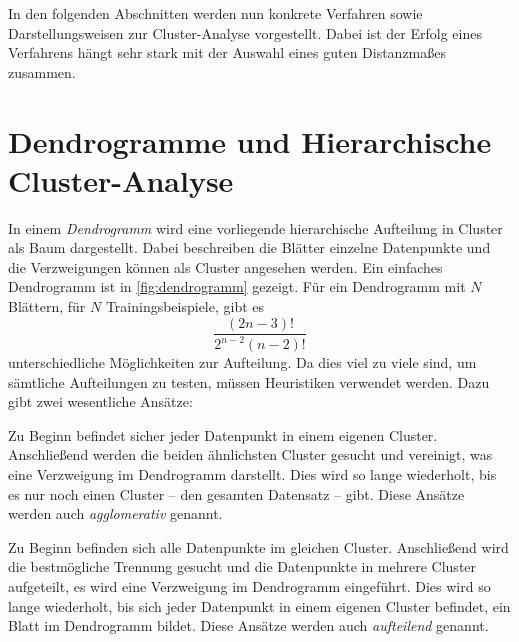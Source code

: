 	In den folgenden Abschnitten werden nun konkrete Verfahren sowie Darstellungsweisen zur Cluster-Analyse vorgestellt. Dabei ist der Erfolg eines Verfahrens hängt sehr stark mit der Auswahl eines guten Distanzmaßes zusammen.

	\section{Dendrogramme und Hierarchische Cluster-Analyse}
		In einem \emph{Dendrogramm} wird eine vorliegende hierarchische Aufteilung in Cluster als Baum dargestellt. Dabei beschreiben die Blätter einzelne Datenpunkte und die Verzweigungen können als Cluster angesehen werden. Ein einfaches Dendrogramm ist in \autoref{fig:dendrogramm} gezeigt. Für ein Dendrogramm mit \(N\) Blättern, \dh für \(N\) Trainingsbeispiele, gibt es
		\begin{equation}
			\frac{(2n - 3)!}{2^{n - 2} (n - 2)!}
		\end{equation}
		unterschiedliche Möglichkeiten zur Aufteilung. Da dies viel zu viele sind, um sämtliche Aufteilungen zu testen, müssen Heuristiken verwendet werden. Dazu gibt zwei wesentliche Ansätze:
		\begin{description}[leftmargin = 2.5cm]
			\item[Bottom-Up] Zu Beginn befindet sicher jeder Datenpunkt in einem eigenen Cluster. Anschließend werden die beiden ähnlichsten Cluster gesucht und vereinigt, was eine Verzweigung im Dendrogramm darstellt. Dies wird so lange wiederholt, bis es nur noch einen Cluster -- den gesamten Datensatz -- gibt. Diese Ansätze werden auch \emph{agglomerativ} genannt.
			\item[Top-Down] Zu Beginn befinden sich alle Datenpunkte im gleichen Cluster. Anschließend wird die bestmögliche Trennung gesucht und die Datenpunkte in mehrere Cluster aufgeteilt, \dh es wird eine Verzweigung im Dendrogramm eingeführt. Dies wird so lange wiederholt, bis sich jeder Datenpunkt in einem eigenen Cluster befindet, \dh ein Blatt im Dendrogramm bildet. Diese Ansätze werden auch \emph{aufteilend} genannt.
		\end{description}

